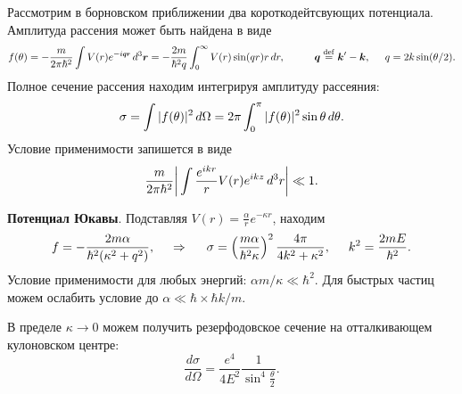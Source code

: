 
Рассмотрим в борновском приближении два короткодейтсвующих потенциала. Амплитуда рассения может быть найдена в виде
\begin{equation*}
	f(\theta) = - \frac{m}{2 \pi \hbar^2} \int V(r) e^{-i \smallvc{q} \smallvc{r}} \d^3 \vc{r} = - \frac{2m}{\hbar^2 q} \int_{0}^{\infty} V(r) \sin(qr) r \d r,
	\hspace{10 mm} 
	\vc{q} \overset{\mathrm{def}}{=} \vc{k}' - \vc{k},
	\hspace{5 mm} 
	q = 2 k \sin(\theta/2).
\end{equation*}
Полное сечение рассения находим интегрируя амплитуду рассеяния:
\begin{equation*}
	\sigma = \int |f(\theta)|^2 \, d \Omega = 2 \pi \int_{0}^{\pi} |f(\theta)|^2 \sin \theta \, d \theta.
\end{equation*}
Условие применимости запишется в виде
\begin{equation*}
	\frac{m}{2\pi \hbar^2} \bigg| \int \frac{e^{i k r}}{r} V(r) e^{i k z} \, d^3 r \bigg| \ll 1.
\end{equation*}


\textbf{Потенциал Юкавы}. Подставляя $V(r) = \frac{\alpha}{r} e^{- \kappa r}$, находим
\begin{equation*}
	f = - \frac{2 m \alpha}{\hbar^2 (\kappa^2 + q^2)},
	\hspace{0.5cm} \Rightarrow \hspace{0.5cm}
	\sigma = \left(\frac{m \alpha}{\hbar^2 \kappa}\right)^2 \frac{4\pi}{4 k^2 + \kappa^2},
	\hspace{5 mm} 
	k^2 = \frac{2 mE}{\hbar^2}.
\end{equation*}
Условие применимости для любых энергий: $\alpha m / \kappa \ll \hbar^2$. Для быстрых частиц можем ослабить условие до $\alpha \ll \hbar \times \hbar k/m$.

В пределе $\kappa \to 0$ можем получить резерфодовское сечение на отталкивающем кулоновском центре:
\begin{equation*}
	\frac{d \sigma}{d \Omega} = \frac{e^4}{4 E^2} \frac{1}{\sin^4 \frac{\theta}{2}}.
\end{equation*}


